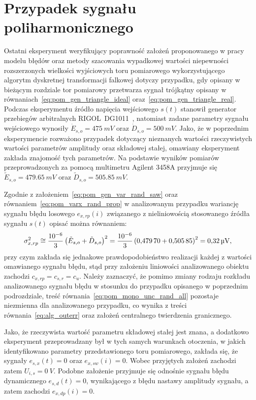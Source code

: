 \section{Przypadek sygnału poliharmonicznego}

Ostatni eksperyment weryfikujący poprawność założeń proponowanego w pracy modelu błędów oraz metody szacowania wypadkowej wartości niepewności rozszerzonych wielkości wyjściowych toru pomiarowego wykorzystującego algorytm dyskretnej transformacji falkowej dotyczy przypadku, gdy opisany w bieżącym rozdziale tor pomiarowy przetwarza sygnał trójkątny opisany w równaniach~\eqref{eq:pom_gen_triangle_ideal} oraz~\eqref{eq:pom_gen_triangle_real}. Podczas eksperymentu źródło napięcia wejściowego $s(t)$ stanowił generator przebiegów arbitralnych RIGOL~DG1011~\cite{rigol_fawg}, natomiast zadane parametry sygnału wejściowego wynosiły $\dot{E}_{s,o} = \qty{475}{mV}$ oraz $\dot{D}_{s,o} = \qty{500}{mV}$. Jako, że w poprzednim eksperymencie rozważono przypadek dotyczący nieznanych wartości rzeczywistych wartości parametrów amplitudy oraz składowej stałej, omawiany eksperyment zakłada znajomość tych parametrów. Na podstawie wyników pomiarów przeprowadzonych za pomocą multimetru Agilent 3458A przyjmuje się $\tilde{E}_{s,o} = \qty{479.65}{mV}$ oraz $\tilde{D}_{s,o} = \qty{505.85}{mV}$.

Zgodnie z założeniem~\eqref{eq:pom_gen_var_rand_saw} oraz równaniem~\eqref{eq:pom_varx_rand_prop} w analizowanym przypadku wariancję sygnału błędu losowego $e_{x,rp}(i)$ związanego z nieliniowością stosowanego źródła sygnału $s(t)$ opisać można równaniem:
\begin{equation}
\sigma_{x,rp}^{2} \cong \frac{\num{e-6}}{3} \left(\tilde{E}_{s,o} + \tilde{D}_{s,o}\right)^{2} = \frac{\num{e-6}}{3} \left(\num{0.47970} + \num{0.50585}\right)^{2} = \qty{0.32}{\micro V} \label{eq:pom_multi_rand_var_in},
\end{equation}
przy czym zakłada się jednakowe prawdopodobieństwo realizacji każdej z wartości omawianego sygnału błędu, stąd przy założeniu liniowości analizowanego obiektu zachodzi $c_{x,rp} = c_{s,r} = c_{u}$. Należy zaznaczyć, że pomimo zmiany rodzaju rozkładu analizowanego sygnału błędu w stosunku do przypadku opisanego w poprzednim podrozdziale, treść równania~\eqref{eq:pom_mono_unc_rand_all} pozostaje niezmienna dla analizowanego przypadku, co wynika z treści równania~\eqref{eq:alg_outerr} oraz założeń centralnego twierdzenia granicznego.

Jako, że rzeczywista wartość parametru składowej stałej jest znana, a dodatkowo eksperyment przeprowadzany był w tych samych warunkach otoczenia, w jakich identyfikowano parametry przedstawionego toru pomiarowego, zakłada się, że sygnały  $e_{s,x}(t) = 0$ oraz $e_{x,sw}(i) = 0$. Wobec przyjętych założeń zachodzi zatem $U_{i,s} = \qty{0}{V}$. Podobne założenie przyjmuje się odnośnie sygnału błędu dynamicznego $e_{s,d}(t) = 0$, wynikającego z błędu nastawy amplitudy sygnału, a zatem zachodzi $e_{x,dp}(i) = 0$.

